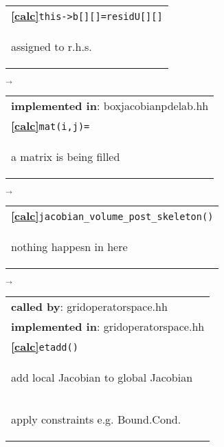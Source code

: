\begin{landscape}
{\begin{tabular}{|l|}
      \hline
      \textbf{\textcircled{\ref{calc}}}\verb+this->b[][]=residU[][]+ \\
    \begin{scriptsize}assigned to r.h.s.\end{scriptsize}\\\hline 
  \end{tabular}
    $\overrightarrow{
    }$
      \begin{tabular}{|l|}
      \hline
      \textbf{implemented in}: boxjacobianpdelab.hh\\  
      \textbf{\textcircled{\ref{calc}}}\verb+mat(i,j)=+ \\
    \begin{scriptsize}a matrix is being filled\end{scriptsize}\\\hline 
  \end{tabular}
    \nextline
    $\overrightarrow{
    }$
      \begin{tabular}{|l|}
      \hline
      \textbf{\textcircled{\ref{calc}}}\verb+jacobian_volume_post_skeleton()+ \\
    \begin{scriptsize}nothing happesn in here\end{scriptsize}\\\hline 
  \end{tabular}
    $\overrightarrow{
    }$
      \begin{tabular}{|l|}
      \hline
	\textbf{called by}: gridoperatorspace.hh\\
      \textbf{implemented in}: gridoperatorspace.hh\\  
      \textbf{\textcircled{\ref{calc}}}\verb+etadd()+ \\
    \begin{scriptsize}add local Jacobian to global Jacobian\end{scriptsize}\\
    \begin{scriptsize}apply constraints e.g. Bound.Cond.\end{scriptsize}\\\hline 
  \end{tabular}
}
\end{landscape}
